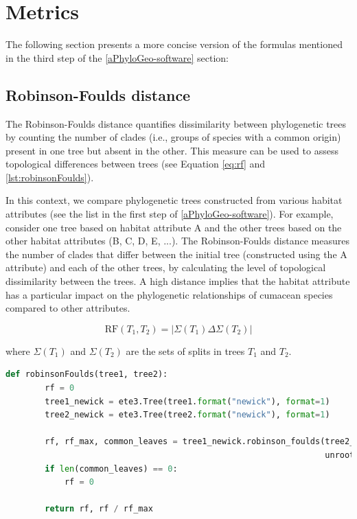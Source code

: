 \section{Metrics}\label{metrics}
The following section presents a more concise version of the formulas mentioned in the third step of the \autoref{aPhyloGeo-software} section:

\subsection{Robinson-Foulds distance}\label{RF}

The Robinson-Foulds distance quantifies dissimilarity between phylogenetic trees by counting the number of clades  (i.e., groups of species with a common origin) present in one tree but absent in the other. This measure can be used to assess topological differences between trees (see Equation \eqref{eq:rf} and \autoref{lst:robinsonFoulds}). 

In this context, we compare phylogenetic trees constructed from various habitat attributes (see the list in the first step of \autoref{aPhyloGeo-software}). For example, consider one tree based on habitat attribute A and the other trees based on the other habitat attributes (B, C, D, E, ...). The Robinson-Foulds distance measures the number of clades that differ between the initial tree (constructed using the A attribute) and each of the other trees, by calculating the level of topological dissimilarity between the trees. A high distance implies that the habitat attribute has a particular impact on the phylogenetic relationships of cumacean species compared to other attributes.

\begin{equation}\label{eq:rf}
    \text{RF}(T_1, T_2) = | \Sigma(T_1) \Delta \Sigma(T_2) |
\end{equation}

where $\Sigma(T_1)$ and $\Sigma(T_2)$ are the sets of splits in trees $T_1$ and $T_2$.

\begin{lstlisting}[label=lst:robinsonFoulds,language=Python,caption=Python script for calculating the Robinson-Foulds distance using the ete3 package in the aPhyloGeo package.]
    def robinsonFoulds(tree1, tree2):
        rf = 0
        tree1_newick = ete3.Tree(tree1.format("newick"), format=1)
        tree2_newick = ete3.Tree(tree2.format("newick"), format=1)

        rf, rf_max, common_leaves = tree1_newick.robinson_foulds(tree2_newick, 
                                                                 unrooted_trees=True)
        if len(common_leaves) == 0:
            rf = 0

        return rf, rf / rf_max
\end{lstlisting}

